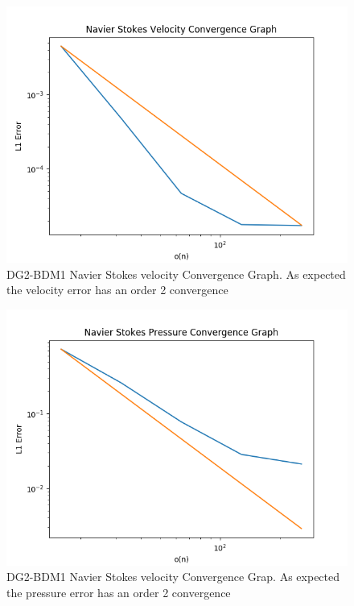 \documentclass[11pt,twoside,a4paper]{article}
\begin{document}
\begin{figure}
  \includegraphics[width=\linewidth]{navier_stokes_convergence_dbc0.png}
  \caption{DG2-BDM1 Navier Stokes velocity Convergence Graph. As expected the velocity error has an order 2 convergence}
\end{figure}

\begin{figure}
\includegraphics[width=\linewidth]{navier_stokes_pressure_convergence_dbc0.png}
  \caption{DG2-BDM1 Navier Stokes velocity Convergence Grap. As expected the pressure error has an order 2 convergence}
\end{figure}
\end{document}
